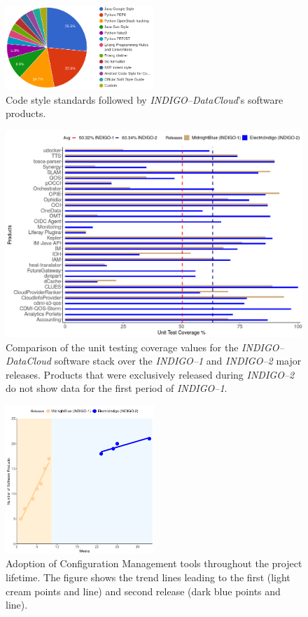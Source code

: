 \documentclass[journal]{IEEEtran}
\begin{document}
\begin{figure}[ht]
\centering
\includegraphics[width=0.5\textwidth]{images/codestyle.png}
\caption{Code style standards followed by {\sl INDIGO--DataCloud}'s software products.}
\label{fig:fig_codestyle}
\end{figure}

\begin{figure}[ht]
\centering
\includegraphics[width=\textwidth]{images/fig2.png}
\caption{Comparison of the unit testing coverage values for the {\sl INDIGO--DataCloud}
software stack over the {\sl INDIGO--1} and {\sl INDIGO--2} major releases. Products that
were exclusively released during {\sl INDIGO--2} do not show data for the first period of
{\sl INDIGO--1}.}
\label{fig:fig_unittest}
\end{figure}

\begin{figure}[ht]
\centering
\includegraphics[width=0.5\textwidth]{images/fig3.png}
\caption{Adoption of Configuration Management tools throughout the project lifetime. The figure shows the trend lines
leading to the first (light cream points and line) and second release (dark blue points and line).}
\label{fig:fig_confman}
\end{figure}
\end{document}
